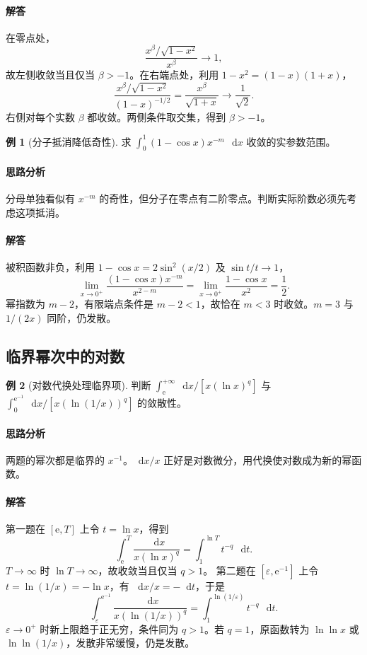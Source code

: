 \documentclass[UTF8,fontset=fandol,12pt,oneside,openany]{ctexrep}
\newcommand{\dd}{\mathop{}\!\mathrm d}
\newcommand{\ee}{\mathrm e}
\theoremstyle{definition}
\newtheorem{example}{例}[chapter]
\begin{document}
\paragraph{解答} 在零点处，
\[
\frac{x^\beta/\sqrt{1-x^2}}{x^\beta}\to1,
\]
故左侧收敛当且仅当 $\beta>-1$。在右端点处，利用 $1-x^2=(1-x)(1+x)$，
\[
\frac{x^\beta/\sqrt{1-x^2}}{(1-x)^{-1/2}}
=\frac{x^\beta}{\sqrt{1+x}}\to\frac1{\sqrt2}.
\]
右侧对每个实数 $\beta$ 都收敛。两侧条件取交集，得到 $\beta>-1$。

\begin{example}[分子抵消降低奇性]
求 $\int_0^1(1-\cos x)x^{-m}\,\dd x$ 收敛的实参数范围。
\end{example}
\paragraph{思路分析} 分母单独看似有 $x^{-m}$ 的奇性，但分子在零点有二阶零点。判断实际阶数必须先考虑这项抵消。
\paragraph{解答} 被积函数非负，利用 $1-\cos x=2\sin^2(x/2)$ 及 $\sin t/t\to1$，
\[
\lim_{x\to0^+}\frac{(1-\cos x)x^{-m}}{x^{2-m}}
=\lim_{x\to0^+}\frac{1-\cos x}{x^2}=\frac12.
\]
幂指数为 $m-2$，有限端点条件是 $m-2<1$，故恰在 $m<3$ 时收敛。$m=3$ 与 $1/(2x)$ 同阶，仍发散。

\subsection{临界幂次中的对数}
\label{lec:13:logarithm}
\begin{example}[对数代换处理临界项]
判断 $\int_\ee^{+\infty}\dd x/[x(\ln x)^q]$ 与
$\int_0^{\ee^{-1}}\dd x/[x(\ln(1/x))^q]$ 的敛散性。
\end{example}
\paragraph{思路分析} 两题的幂次都是临界的 $x^{-1}$。$\dd x/x$ 正好是对数微分，用代换使对数成为新的幂函数。
\paragraph{解答} 第一题在 $[\ee,T]$ 上令 $t=\ln x$，得到
\[
\int_\ee^T\frac{\dd x}{x(\ln x)^q}
=\int_1^{\ln T}t^{-q}\,\dd t.
\]
$T\to\infty$ 时 $\ln T\to\infty$，故收敛当且仅当 $q>1$。
第二题在 $[\varepsilon,\ee^{-1}]$ 上令 $t=\ln(1/x)=-\ln x$，有 $\dd x/x=-\dd t$，于是
\[
\int_\varepsilon^{\ee^{-1}}\frac{\dd x}{x(\ln(1/x))^q}
=\int_1^{\ln(1/\varepsilon)}t^{-q}\,\dd t.
\]
$\varepsilon\to0^+$ 时新上限趋于正无穷，条件同为 $q>1$。若 $q=1$，原函数转为 $\ln\ln x$ 或 $\ln\ln(1/x)$，发散非常缓慢，仍是发散。
\end{document}
